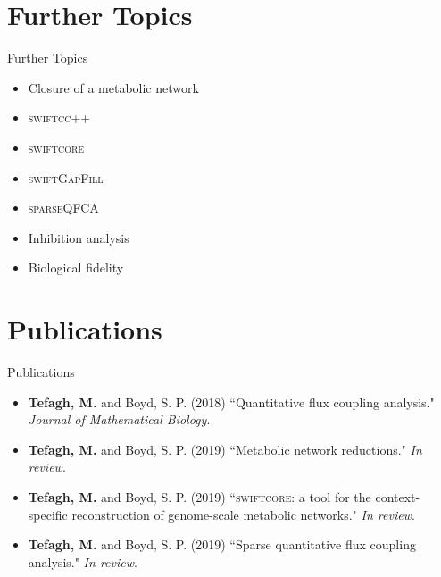 \documentclass[10pt]{beamer}
\theoremstyle{remark}
\theoremstyle{definition}
\begin{document}
\section{Further Topics}
\begin{frame}{Further Topics}{}

	\begin{itemize}
		\item<1-> Closure of a metabolic network
		\item<2-> \textsc{swiftcc++}
		\item<3-> \textsc{swiftcore}
		\item<4-> \textsc{swiftGapFill}
		\item<5-> \textsc{sparseQFCA}
		\item<6-> Inhibition analysis
		\item<7-> Biological fidelity
	\end{itemize}
	
\end{frame}

\iffalse

\section{Publications}
\begin{frame}{Publications}{}

	\begin{itemize}
		\item<1-> \textbf{Tefagh, M.} and Boyd, S. P. (2018) ``Quantitative flux coupling analysis." \emph{Journal of Mathematical Biology}.
		\item<2-> \textbf{Tefagh, M.} and Boyd, S. P. (2019) ``Metabolic network reductions." \emph{In review}.
		\item<3-> \textbf{Tefagh, M.} and Boyd, S. P. (2019) ``\textsc{swiftcore}: a tool for the context-specific reconstruction of genome-scale metabolic networks." \emph{In review}.
		\item<4-> \textbf{Tefagh, M.} and Boyd, S. P. (2019) ``Sparse quantitative flux coupling analysis." \emph{In review}.
	\end{itemize}

\end{frame}

\end{document}
